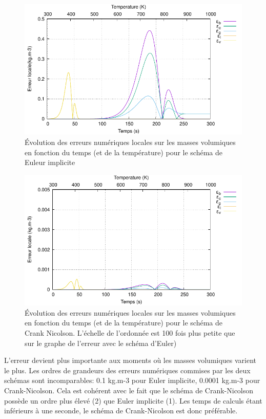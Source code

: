 \documentclass[a4paper,11pt]{article}
\begin{document}
\begin{figure}[H]
    \centering
    \includegraphics[width=0.9\linewidth]{images/error_EI.pdf}
    \caption{Évolution des erreurs numériques locales sur les masses volumiques en fonction du temps (et de la température) pour le schéma de Euleur implicite }
    \label{fig:erEI}
\end{figure}


\begin{figure}[H]
    \centering
    \includegraphics[width=0.9\linewidth]{images/error_CK2.pdf}
    \caption{Évolution des erreurs numériques locales sur les masses volumiques en fonction du temps (et de la température) pour le schéma de Crank Nicolson. L'échelle de l'ordonnée est 100 fois plus petite que sur le graphe de l'erreur avec le schéma d'Euler)}
    \label{fig:erCK2}
\end{figure}

L'erreur devient plus importante aux moments où les masses volumiques varient le plus. Les ordres de grandeurs des erreurs numériques commises par les deux schémas sont incomparables: 0.1 kg.m-3 pour Euler implicite, 0.0001 kg.m-3 pour Crank-Nicolson. Cela est cohérent avec le fait que le schéma de Crank-Nicolson possède un ordre plus élevé (2) que Euler implicite (1). Les temps de calculs étant inférieurs à une seconde, le schéma de Crank-Nicolson est donc préférable.
\end{document}
